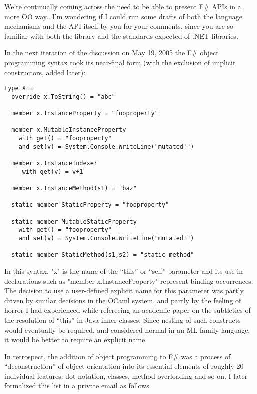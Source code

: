 \documentclass[acmsmall,review]{acmart}\settopmatter{printfolios=true,printccs=false,printacmref=false}
\begin{document}
\begin{verbquote}
We're continually coming across the need to be able to present F\# APIs in a more OO way...I'm wondering if I could run some drafts of both the language mechanisms and the API itself by you for your comments, since you are so familiar with both the library and the standards expected of .NET libraries. 
\end{verbquote}

In the next iteration of the discussion on May 19, 2005 the F\# object programming syntax took its near-final form (with the exclusion of implicit constructors, added later):
\begin{verbatim}
type X =
  override x.ToString() = "abc"

  member x.InstanceProperty = "fooproperty"

  member x.MutableInstanceProperty
    with get() = "fooproperty"
    and set(v) = System.Console.WriteLine("mutated!")
    
  member x.InstanceIndexer
     with get(v) = v+1
     
  member x.InstanceMethod(s1) = "baz"

  static member StaticProperty = "fooproperty"

  static member MutableStaticProperty
    with get() = "fooproperty"
    and set(v) = System.Console.WriteLine("mutated!")
    
  static member StaticMethod(s1,s2) = "static method"
\end{verbatim}

In this syntax, "x" is the name of the “this” or “self” parameter and its use in declarations such as "member x.InstanceProperty" represent binding occurrences.  The decision to use a user-defined explicit name for this parameter was partly driven by similar decisions in the OCaml system, and partly by the feeling of horror I had experienced while refereeing an academic paper on the subtleties of the resolution of “this” in Java inner classes.  Since nesting of such constructs would eventually be required, and considered normal in an ML-family language, it would be better to require an explicit name.

In retrospect, the addition of object programming to F\# was a process of “deconstruction” of object-orientation into its essential elements of roughly 20 individual features: dot-notation, classes, method-overloading and so on.  I later formalized this list in a private email as follows.
\end{document}
